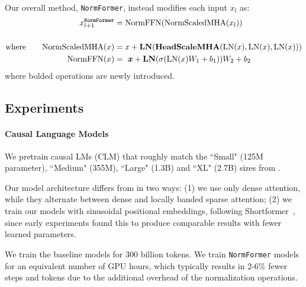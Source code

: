 \documentclass{article} %
\begin{document}
Our overall method, \texttt{NormFormer}, instead modifies each input $x_l$ as: 
\begin{align*}
x_{l+1}^{\texttt{NormFormer}} &= \mathrm{NormFFN}(\mathrm{NormScaledMHA}(x_l)) \\
\\
\mathrm{where\qquad} \mathrm{NormScaledMHA}(x) &= x + \mathrm{\textbf{LN}}(\mathrm{\bf{HeadScaleMHA}}(\mathrm{LN}(x),\mathrm{LN}(x),\mathrm{LN}(x)))\\
\mathrm{NormFFN}(x) &= ~\bm{x} + \mathrm{\textbf{LN}}(\sigma(\mathrm{LN}(x)W_1 + b_1)) W_2 + b_2
\end{align*}
where bolded operations are newly introduced. %

\subsection{Experiments}\label{sec:experiments}

\paragraph{Causal Language Models}
We pretrain causal LMs (CLM) that roughly match the ``Small" (125M parameter), ``Medium" (355M), ``Large" (1.3B) and ``XL" (2.7B) sizes from \citet{brown2020gpt3}.

Our model architecture differs from \citet{brown2020gpt3} in two ways: (1) we use only dense attention, while they alternate between dense and locally banded sparse attention; (2) we train our models with sinusoidal positional embeddings, following Shortformer~\citep{press2020shortformer}, since early experiments found this to produce comparable results with fewer learned parameters.

We train the baseline models for 300 billion tokens.
We train \texttt{NormFormer} models for an equivalent number of GPU hours, which typically results in 2-6\% fewer steps and tokens due to the additional overhead of the normalization operations.
\end{document}
